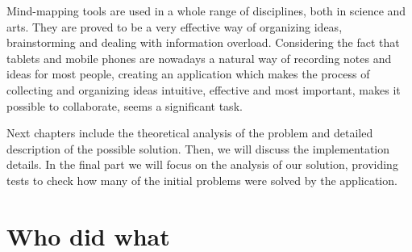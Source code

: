 
Mind-mapping tools are used in a whole range of disciplines, both in science and arts. They are proved to be a very effective way of organizing ideas, brainstorming and dealing with information overload. Considering the fact that tablets and mobile phones are nowadays a natural way of recording notes and ideas for most people, creating an application which makes the process of collecting and organizing ideas intuitive, effective and most important, makes it possible to collaborate, seems a significant task.


Next chapters include the theoretical analysis of the problem and detailed description of the possible solution. Then, we will discuss the implementation details. In the final part we will focus on the analysis of our solution, providing tests to check how many of the initial problems were solved by the application.

\section{Who did what}
\label{sec:who-did-what}


